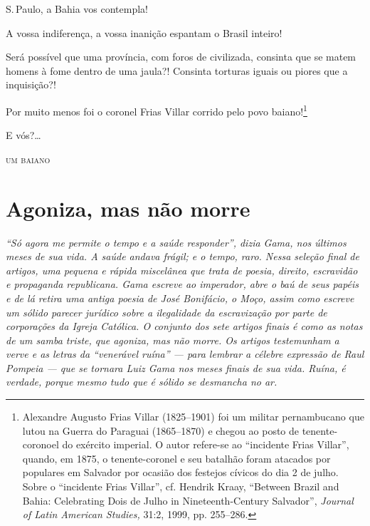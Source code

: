 S.\,Paulo, a Bahia vos contempla!

A vossa indiferença, a vossa inanição espantam o Brasil inteiro!

Será possível que uma província, com foros de civilizada, consinta que
se matem homens à fome dentro de uma jaula?! Consinta torturas iguais ou
piores que a inquisição?!

Por muito menos foi o coronel Frias Villar corrido pelo povo
baiano!\footnote{Alexandre Augusto Frias Villar (1825--1901) foi um
  militar pernambucano que lutou na Guerra do Paraguai (1865--1870) e
  chegou ao posto de tenente-coronoel do exército imperial. O autor
  refere-se ao ``incidente Frias Villar'', quando, em 1875, o
  tenente-coronel e seu batalhão foram atacados por populares em
  Salvador por ocasião dos festejos cívicos do dia 2 de julho. Sobre
  o ``incidente Frias Villar'', cf. Hendrik Kraay, ``Between Brazil and
  Bahia: Celebrating Dois de Julho in Nineteenth-Century Salvador'',
  \emph{Journal of Latin American Studies,} 31:2, 1999, pp. 255--286.}

E vós?\ldots{}

\medskip
\hfill\textsc{um baiano}

\part{Agoniza, mas não morre}

\begin{didas}
\emph{``Só agora me permite o tempo e a saúde responder'', dizia Gama, nos
últimos meses de sua vida. A saúde andava frágil; e o tempo, raro. Nessa
seleção final de artigos, uma pequena e rápida miscelânea que trata de
poesia, direito, escravidão e propaganda republicana. Gama escreve ao
imperador, abre o baú de seus papéis e de lá retira uma antiga poesia de
José Bonifácio, o Moço, assim como escreve um sólido parecer jurídico
sobre a ilegalidade da escravização por parte de corporações
da Igreja Católica. O conjunto dos sete artigos finais é como as notas
de um samba triste, que agoniza, mas não morre. Os artigos testemunham a
verve e as letras da ``venerável ruína'' --- para lembrar a célebre
expressão de Raul Pompeia --- que se tornara Luiz Gama nos meses finais
de sua vida. Ruína, é verdade, porque mesmo tudo que é sólido se
desmancha no ar.}
\end{didas}




